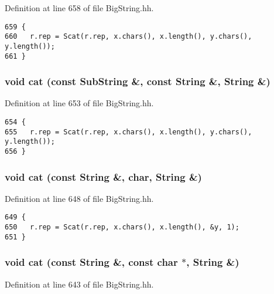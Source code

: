 Definition at line 658 of file Big\-String.hh.



\footnotesize\begin{verbatim}659 {
660   r.rep = Scat(r.rep, x.chars(), x.length(), y.chars(), y.length());
661 }
\end{verbatim}\normalsize 
{}
\subsubsection{\setlength{\rightskip}{0pt plus 5cm}void cat (const {\bf Sub\-String} \&, const String \&, String \&)\hspace{0.3cm}{\tt  [friend]}}\label{classString_l5}




Definition at line 653 of file Big\-String.hh.



\footnotesize\begin{verbatim}654 {
655   r.rep = Scat(r.rep, x.chars(), x.length(), y.chars(), y.length());
656 }
\end{verbatim}\normalsize 
{}
\subsubsection{\setlength{\rightskip}{0pt plus 5cm}void cat (const String \&, char, String \&)\hspace{0.3cm}{\tt  [friend]}}\label{classString_l4}




Definition at line 648 of file Big\-String.hh.



\footnotesize\begin{verbatim}649 {
650   r.rep = Scat(r.rep, x.chars(), x.length(), &y, 1);
651 }
\end{verbatim}\normalsize 
{}
\subsubsection{\setlength{\rightskip}{0pt plus 5cm}void cat (const String \&, const char $\ast$, String \&)\hspace{0.3cm}{\tt  [friend]}}\label{classString_l3}




Definition at line 643 of file Big\-String.hh.



